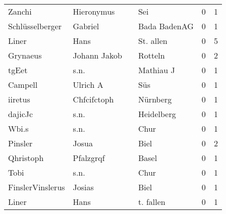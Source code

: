 \begin{center}
\begin{tiny}
\begin{longtabu}{llllrr}
                   Zanchi &                         Hieronymus &             &                                         Sei &          0 &         1 \\
          Schlüsselberger &                            Gabriel &             &                                Bada BadenAG &          0 &         1 \\
                    Liner &                               Hans &             &                                   St. allen &          0 &         5 \\
                 Grynaeus &                       Johann Jakob &             &                                     Rotteln &          0 &         2 \\
                    tgEet &                               s.n. &             &                                   Mathiau J &          0 &         1 \\
                  Campell &                           Ulrich A &             &                                         Süs &          0 &         1 \\
                  iiretus &                        Chfcifctoph &             &                                    Nürnberg &          0 &         1 \\
                  dajicJc &                               s.n. &             &                                  Heidelberg &          0 &         1 \\
                    Wbi.s &                               s.n. &             &                                        Chur &          0 &         1 \\
                  Pinsler &                              Josua &             &                                        Biel &          0 &         2 \\
                Qhristoph &                          Pfalzgrqf &             &                                       Basel &          0 &         1 \\
                     Tobi &                               s.n. &             &                                        Chur &          0 &         1 \\
         FinslerVinslerus &                             Josias &             &                                        Biel &          0 &         1 \\
                    Liner &                               Hans &             &                                   t. fallen &          0 &         1 \\

\end{longtabu}
\end{tiny}
\end{center}

